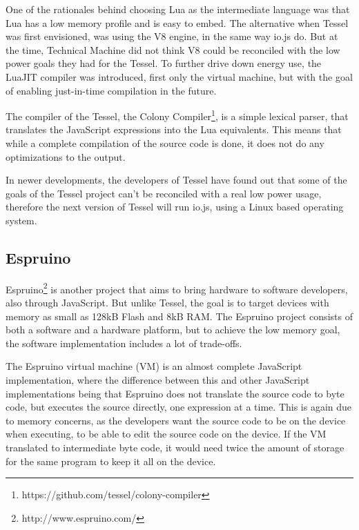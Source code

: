 One of the rationales behind choosing Lua as the intermediate language was that Lua has a low memory profile and is easy to embed.
The alternative when Tessel was first envisioned, was using the V8 engine, in the same way io.js do.
But at the time, Technical Machine did not think V8 could be reconciled with the low power goals they had for the Tessel.
To further drive down energy use, the LuaJIT compiler was introduced, first only the virtual machine, but with the goal of enabling just-in-time compilation in the future. 

The compiler of the Tessel, the Colony Compiler\footnote{https://github.com/tessel/colony-compiler}, is a simple lexical parser, that translates the JavaScript expressions into the Lua equivalents.
This means that while a complete compilation of the source code is done, it does not do any optimizations to the output.

In newer developments, the developers of Tessel have found out that some of the goals of the Tessel project can’t be reconciled with a real low power usage, therefore the next version of Tessel will run io.js, using a Linux based operating system.

\subsection{Espruino}
Espruino\footnote{http://www.espruino.com/} is another project that aims to bring hardware to software developers, also through JavaScript.
But unlike Tessel, the goal is to target devices with memory as small as 128kB Flash and 8kB RAM.
The Espruino project consists of both a software and a hardware platform, but to achieve the low memory goal, the software implementation includes a lot of trade-offs.

The Espruino virtual machine (VM) is an almost complete JavaScript implementation, where the difference between this and other JavaScript implementations being that Espruino does not translate the source code to byte code, but executes the source directly, one expression at a time.
This is again due to memory concerns, as the developers want the source code to be on the device when executing, to be able to edit the source code on the device. 
If the VM translated to intermediate byte code, it would need twice the amount of storage for the same program to keep it all on the device.

